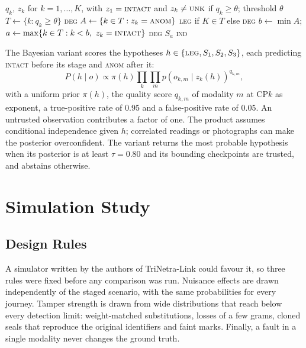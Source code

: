 \documentclass[conference]{IEEEtran}
\newcommand{\LEG}{\textsc{leg}}
\newcommand{\DEG}{\textsc{deg}}
\newcommand{\IND}{\textsc{ind}}
\newcommand{\ANOM}{\textsc{anom}}
\newcommand{\INTACT}{\textsc{intact}}
\newcommand{\UNK}{\textsc{unk}}
\begin{document}
\begin{algorithm}[t]
\caption{Interval attribution}
\label{alg:interval}
\begin{algorithmic}[1]
\Require $q_k$, $z_k$ for $k=1,\dots,K$, with $z_1=\INTACT$ and $z_k\neq\UNK$ if $q_k\ge\theta$; threshold $\theta$
\State $T \gets \{k : q_k \ge \theta\}$
 \Return \DEG \EndIf
\State $A \gets \{k \in T : z_k = \ANOM\}$
 \Return \LEG{} if $K \in T$ else \DEG \EndIf
\State $b \gets \min A$; \; $a \gets \max\{k \in T : k < b,\ z_k = \INTACT\}$
 \Return \DEG \EndIf
{} \Return $S_a$ \EndIf
\State \Return \IND
\end{algorithmic}
\end{algorithm}

The Bayesian variant scores the hypotheses $h \in \{\LEG, S_1, S_2, S_3\}$, each predicting \INTACT{} before its stage and \ANOM{} after it:
\begin{equation}
P(h \mid o) \propto \pi(h) \prod_k \prod_m p\!\left(o_{k,m} \mid z_k(h)\right)^{q_{k,m}},
\end{equation}
with a uniform prior $\pi(h)$, the quality score $q_{k,m}$ of modality $m$ at CP$k$ as exponent, a true-positive rate of 0.95 and a false-positive rate of 0.05. An untrusted observation contributes a factor of one. The product assumes conditional independence given $h$; correlated readings or photographs can make the posterior overconfident. The variant returns the most probable hypothesis when its posterior is at least $\tau=0.80$ and its bounding checkpoints are trusted, and abstains otherwise.

\section{Simulation Study}\label{sec:sim}
\subsection{Design Rules}
A simulator written by the authors of TriNetra-Link could favour it, so three rules were fixed before any comparison was run. Nuisance effects are drawn independently of the staged scenario, with the same probabilities for every journey. Tamper strength is drawn from wide distributions that reach below every detection limit: weight-matched substitutions, losses of a few grams, cloned seals that reproduce the original identifiers and faint marks. Finally, a fault in a single modality never changes the ground truth.
\end{document}
